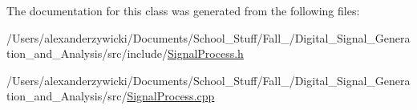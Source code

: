 The documentation for this class was generated from the following files\+:\begin{DoxyCompactItemize}
\item 
/\+Users/alexanderzywicki/\+Documents/\+School\+\_\+\+Stuff/\+Fall\+\_/\+Digital\+\_\+\+Signal\+\_\+\+Generation\+\_\+and\+\_\+\+Analysis/src/include/\hyperlink{SignalProcess_8h}{Signal\+Process.\+h}\item 
/\+Users/alexanderzywicki/\+Documents/\+School\+\_\+\+Stuff/\+Fall\+\_/\+Digital\+\_\+\+Signal\+\_\+\+Generation\+\_\+and\+\_\+\+Analysis/src/\hyperlink{SignalProcess_8cpp}{Signal\+Process.\+cpp}\end{DoxyCompactItemize}
